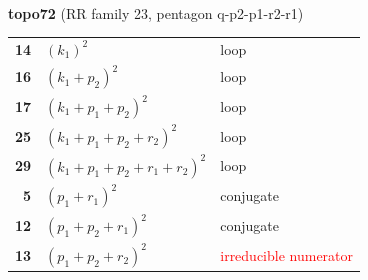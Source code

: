 \documentclass[10pt]{article}
\begin{document}
\begin{minipage}[t]{0.48\textwidth}
{}\\[2mm]\textbf{topo72} (RR family 23, pentagon q-p2-p1-r2-r1)\\[2pt]{\footnotesize\begin{tabular}{@{}r@{\ \ }l@{\ \ }l@{}}\textbf{14} & $(k_1)^2$ & loop\\
\textbf{16} & $(k_1+p_2)^2$ & loop\\
\textbf{17} & $(k_1+p_1+p_2)^2$ & loop\\
\textbf{25} & $(k_1+p_1+p_2+r_2)^2$ & loop\\
\textbf{29} & $(k_1+p_1+p_2+r_1+r_2)^2$ & loop\\
\textbf{5} & $(p_1+r_1)^2$ & conjugate\\
\textbf{12} & $(p_1+p_2+r_1)^2$ & conjugate\\
\textbf{13} & $(p_1+p_2+r_2)^2$ & \textcolor{red}{irreducible numerator}\\\end{tabular}}\end{minipage}

\bigskip
\end{document}
